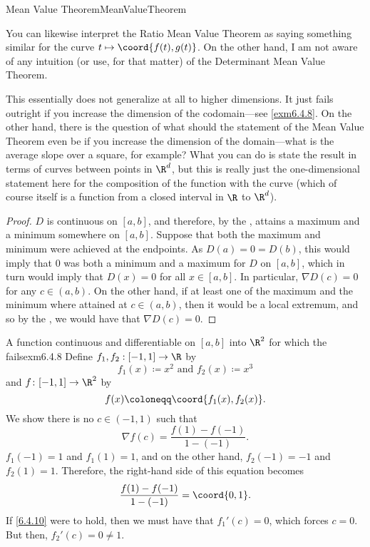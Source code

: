 \begin{thm}{Mean Value Theorem}{MeanValueTheorem}
\begin{rmk}
You can likewise interpret the Ratio Mean Value Theorem as saying something similar for the curve $t\mapsto \coord{f(t),g(t)}$.  On the other hand, I am not aware of any intuition (or use, for that matter) of the Determinant Mean Value Theorem.
\end{rmk}
\begin{rmk}
This essentially does not generalize at all to higher dimensions.  It just fails outright if you increase the dimension of the codomain---see \cref{exm6.4.8}.  On the other hand, there is the question of what should the statement of the Mean Value Theorem even be if you increase the dimension of the domain---what is the average slope over a square, for example?  What you can do is state the result in terms of curves between points in $\R ^d$, but this is really just the one-dimensional statement here for the composition of the function with the curve (which of course itself is a function from a closed interval in $\R$ to $\R ^d$).
\end{rmk}
\begin{proof}
$D$ is continuous on $[a,b]$, and therefore, by the , attains a maximum and a minimum somewhere on $[a,b]$.  Suppose that both the maximum and minimum were achieved at the endpoints.  As $D(a)=0=D(b)$, this would imply that $0$ was both a minimum and a maximum for $D$ on $[a,b]$, which in turn would imply that $D (x)=0$ for all $x\in [a,b]$.  In particular, $\nabla D(c)=0$ for any $c\in (a,b)$.  On the other hand, if at least one of the maximum and the minimum where attained at $c\in (a,b)$, then it would be a local extremum, and so by the , we would have that $\nabla D(c)=0$.
\end{proof}
\end{thm}

\begin{exm}{A function continuous and differentiable on ${[a,b]}$ into $\R ^2$ for which the  fails}{exm6.4.8}
Define $f_1,f_2:[-1,1]\rightarrow \R$ by
\begin{equation}
f_1(x)\coloneqq x^2\text{ and }f_2(x)\coloneqq x^3
\end{equation}
and $f\colon [-1,1]\rightarrow \R ^2$ by
\begin{equation}
f(x)\coloneqq \coord{f_1(x),f_2(x)}.
\end{equation}
We show there is no $c\in (-1,1)$ such that
\begin{equation}\label{6.4.10}
\nabla f(c)=\frac{f(1)-f(-1)}{1-(-1)}.
\end{equation}
$f_1(-1)=1$ and $f_1(1)=1$, and on the other hand, $f_2(-1)=-1$ and $f_2(1)=1$.  Therefore, the right-hand side of this equation becomes
\begin{equation}
\frac{f(1)-f(-1)}{1-(-1)}=\coord{0,1}.
\end{equation}
If \eqref{6.4.10} were to hold, then we must have that $f_1'(c)=0$, which forces $c=0$.  But then, $f_2'(c)=0\neq 1$.
\end{exm}

